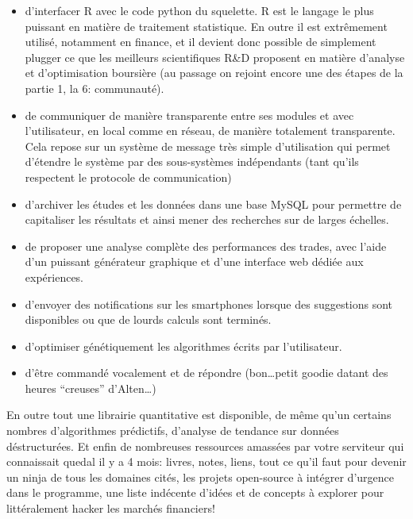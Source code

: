 \begin{itemize}

  \item d'interfacer R avec le code python du squelette. R est
    le langage le plus puissant en matière de traitement statistique. En
    outre il est extrêmement utilisé, notamment en finance, et il devient
    donc possible de simplement plugger ce que les meilleurs scientifiques
    R\&D proposent en matière d'analyse et d'optimisation boursière (au
    passage on rejoint encore une des étapes de la partie 1, la 6:
    communauté).\newline

  \item de communiquer de manière transparente entre ses modules et
    avec l'utilisateur, en local comme en réseau, de manière totalement
    transparente. Cela repose sur un système de message très simple
    d'utilisation qui permet d'étendre le système par des sous-systèmes
    indépendants (tant qu'ils respectent le protocole de
    communication)\newline

  \item d'archiver les études et les données dans une base MySQL
    pour permettre de capitaliser les résultats et ainsi mener des recherches
    sur de larges échelles. \newline

  \item de proposer une analyse complète des performances des trades, avec
    l'aide d'un puissant générateur graphique et d'une interface web dédiée
    aux expériences.\newline

  \item d'envoyer des notifications sur les smartphones lorsque des
    suggestions sont disponibles ou que de lourds calculs sont
    terminés.\newline

  \item d'optimiser génétiquement les algorithmes écrits par
    l'utilisateur.\newline

  \item d'être commandé vocalement et de répondre (bon\ldots petit goodie datant
    des heures ``creuses'' d'Alten\ldots)\newline
    \newline

\end{itemize}

En outre tout une librairie quantitative est disponible, de même qu'un
certains nombres d'algorithmes prédictifs, d'analyse de tendance sur
données déstructurées.\newline
Et enfin de nombreuses ressources amassées par votre serviteur qui
connaissait quedal il y a 4 mois: livres, notes, liens,
tout ce qu'il faut pour devenir un ninja de tous les domaines cités, les
projets open-source à intégrer d'urgence dans le programme, une liste
indécente d'idées et de concepts à explorer pour littéralement hacker les
marchés financiers!\newline


